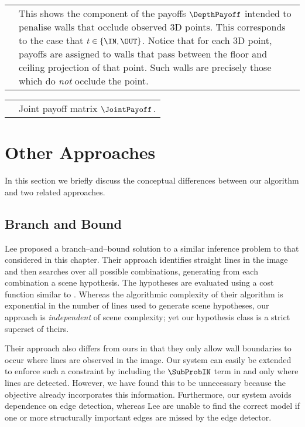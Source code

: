 \begin{tabular}{IT}
   &
  This shows the component of the payoffs $\DepthPayoff$ intended to
  penalise walls that occlude observed 3D points. This corresponds to
  the case that $t\in\{\IN,\OUT\}$. Notice that for each 3D point,
  payoffs are assigned to walls that pass between the floor and
  ceiling projection of that point. Such walls are precisely those
  which do \textit{not} occlude the point.\\
\end{tabular}
\qquad

\begin{tabular}{IT}
   &
  Joint payoff matrix $\JointPayoff$. \\
\end{tabular}

\section{Other Approaches}

In this section we briefly discuss the conceptual differences between
our algorithm and two related approaches.

\subsection{Branch and Bound}
Lee \etal \cite{Lee09} proposed a branch--and--bound solution to a
similar inference problem to that considered in this chapter. Their
approach identifies straight lines in the image and then searches over
all possible combinations, generating from each combination a scene
hypothesis. The hypotheses are evaluated using a cost function similar
to . Whereas the algorithmic complexity of their
algorithm is exponential in the number of lines used to generate scene
hypotheses, our approach is \textit{independent} of scene complexity;
yet our hypothesis class is a strict superset of theirs.

Their approach also differs from ours in that they only allow wall
boundaries to occur where lines are observed in the image. Our system
can easily be extended to enforce such a constraint by including the
$\SubProbIN$ term in  and
 only where lines are detected. However, we
have found this to be unnecessary because the objective
 already incorporates this
information. Furthermore, our system avoids dependence on edge
detection, whereas Lee \etal are unable to find the correct model if
one or more structurally important edges are missed by the edge
detector.

